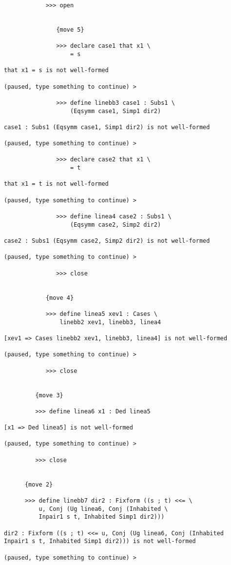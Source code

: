 \documentclass[12pt]{article}
\begin{document}
\begin{verbatim}
            >>> open


               {move 5}

               >>> declare case1 that x1 \
                   = s

that x1 = s is not well-formed

(paused, type something to continue) >

               >>> define linebb3 case1 : Subs1 \
                   (Eqsymm case1, Simp1 dir2)

case1 : Subs1 (Eqsymm case1, Simp1 dir2) is not well-formed

(paused, type something to continue) >

               >>> declare case2 that x1 \
                   = t

that x1 = t is not well-formed

(paused, type something to continue) >

               >>> define linea4 case2 : Subs1 \
                   (Eqsymm case2, Simp2 dir2)

case2 : Subs1 (Eqsymm case2, Simp2 dir2) is not well-formed

(paused, type something to continue) >

               >>> close


            {move 4}

            >>> define linea5 xev1 : Cases \
                linebb2 xev1, linebb3, linea4

[xev1 => Cases linebb2 xev1, linebb3, linea4] is not well-formed

(paused, type something to continue) >

            >>> close


         {move 3}

         >>> define linea6 x1 : Ded linea5

[x1 => Ded linea5] is not well-formed

(paused, type something to continue) >

         >>> close


      {move 2}

      >>> define linebb7 dir2 : Fixform ((s ; t) <<= \
          u, Conj (Ug linea6, Conj (Inhabited \
          Inpair1 s t, Inhabited Simp1 dir2)))

dir2 : Fixform ((s ; t) <<= u, Conj (Ug linea6, Conj (Inhabited Inpair1 s t, Inhabited Simp1 dir2))) is not well-formed

(paused, type something to continue) >


\end{verbatim}
\end{document}
